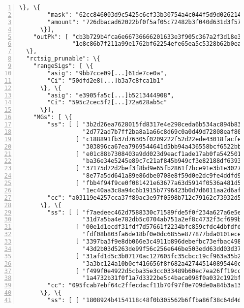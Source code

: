 \begin{appendices}
\begin{Verbatim}[commandchars=\\\{\}, numbers=left]
      \}, \{
        "mask": "62cc846003d9c5425c6cf33b30754a4c044f5d9d02621460e45664b886673109", 
        "amount": "726dbacad62022bf0f5af05c72482b3f040d631d3f576b5e2615ea72f84c5f06"
      \}], 
    "outPk": [ "cb3b729b4fca6e66736666201633e3f905c367a2f3d18e31fe3d3c18d2be93fd", 
               "1e8c86b7f211a99e1762bf62254efe65ea5c5328b62b0ea8d679b2e52800f633"]
  \}, 
  "rctsig_prunable": \{
    "rangeSigs": [ \{
        "asig": "9bb7cce09[...]61de7ce0a", 
        "Ci": "50dfd2e8[...]b3a7c8fca1b1"
      \}, \{
        "asig": "e3905fa5c[...]b5213444908", 
        "Ci": "595c2cec5f2[...]72a628ab5c"
      \}], 
    "MGs": [ \{
        "ss": [ [ "3b2d26ea7628015fd8317e4e298ceda6b534ac894b83f7b6190a353cee6ec702", 
                  "2d772ad7b7ff2ba8a1a66c8d69c0a0d49d72808eaf803c59f13c3d78b653440c"], 
                [ "c188891fb37d76305f0209222f52d22ede43018facfe91f949ecb8dcf709b30a", 
                  "303896ca67ea7969544641d5bb94a436558bcf6522bb9bc77bd1abb5f2146c08"], 
                [ "e01c88b7308403a9dd023d9eacf1ade17ab0fa54250148431b5a33c98e636100", 
                  "ba36e34e5245e89c7c21af845b949cf3e82188df639390f094e31c9ba773060c"], 
                [ "37175d72d2bef3f8bd9e65fb2861f7bce91e3b1e30278b2dcf26112831ac9405", 
                  "8e77a5dd641a89e86dbe0708e8f59d0e2dc9fe4ddfd9b367c3a93522198a4706"], 
                [ "fbb4f94f9ce0f081421e63677a63d5914f0536a481d57b6e5fc5379c84dfcb05", 
                  "1ec40aa3c8a94c6b1915b7796423b0d7d6011aa2d6af636aff309b832f193408"]], 
        "cc": "a03119e4257cca37f89ac3e97f0598b712c79162c73932d58ab4ce08c4ad6709"
      \}, \{
        "ss": [ [ "f7aedeec462d7588330c71589fde5f0f234a627a6e5ed72cff34825a04d41707", 
                  "31d7a5ba4e782db5c0704ab751a2ef8c4732f3cf699bc8f9994e79a97cd3190e"], 
                [ "00e1d1ecdf31fdf7d57661f2234bfc859cfdc4dbfdfd0f5eec0576ef22592203", 
                  "fdf08b803fa6de18bf0e0dc6855e877877bda0101eceb81e2223fe0175606300"], 
                [ "3397ba3f9e8db066e3c4911b896debefbc73efbac4988e6aff5731ff8db15405", 
                  "43d2b03d5263de99f56c256e646be503edd63dd03d377a469379fbf487e8600e"], 
                [ "31afd1d5c3b07170ac127605fc35cbcc19cf963a35b2ff8f804e17e3b804000d", 
                  "3a3bc124a10b0cf416656f8f682a427445140895440cca644c6aa38966399f0c"], 
                [ "f499f0e4922d5cba35e3cc033489b60ec7ea26ff19cc9dd29357670f4bf8790b", 
                  "1a4732b31f0f1a7d3322be5c4baca098f0a032c192bf9f8a6b5fd83cbdd9d401"]], 
        "cc": "095fcab7ebf64c2ffecdacf11b70f97f0e709de0a84b3a13abca627f9df2c901"
      \}, \{
        "ss": [ [ "1808924b4154118c48f0b305562b6ffba86f38c64d4d8a087823f3383cddd006", 

\end{Verbatim}
\end{appendices}
